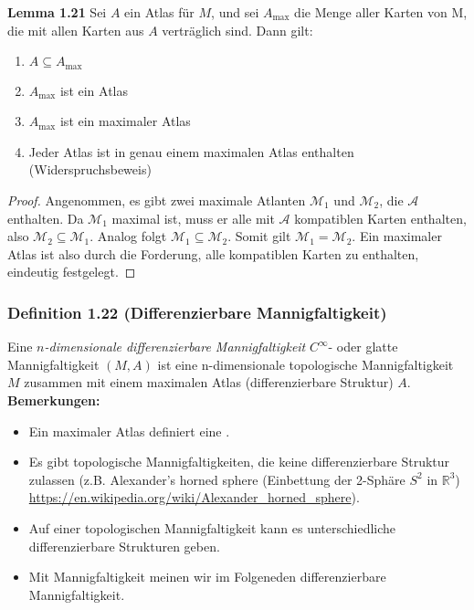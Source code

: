 \documentclass[fleqn, 12pt, letterpaper]{article}
\begin{document}
\textbf{Lemma 1.21}
Sei $A$ ein Atlas für $M$, und sei $A_{\max}$ die Menge aller Karten von M, die mit allen Karten aus $A$ verträglich sind. Dann gilt:
\begin{enumerate}
    \item $A \subseteq A_{\max}$
    \item $A_{\max}$ ist ein Atlas
    \item $A_{\max}$ ist ein maximaler Atlas
    \item Jeder Atlas ist in genau einem maximalen Atlas enthalten (Widerspruchsbeweis)
\end{enumerate}
\begin{proof}
  Angenommen, es gibt zwei maximale Atlanten $\mathcal{M}_1$ und $\mathcal{M}_2$, die $\mathcal{A}$ enthalten. Da $\mathcal{M}_1$ maximal ist, muss er alle mit $\mathcal{A}$ kompatiblen Karten enthalten, also $\mathcal{M}_2 \subseteq \mathcal{M}_1$. Analog folgt $\mathcal{M}_1 \subseteq \mathcal{M}_2$. Somit gilt $\mathcal{M}_1 = \mathcal{M}_2$. Ein maximaler Atlas ist also durch die Forderung, \glqq{}alle kompatiblen Karten zu enthalten\grqq{}, eindeutig festgelegt.
\end{proof}

\subsubsection*{Definition 1.22 (Differenzierbare Mannigfaltigkeit)}
Eine \emph{$n$-dimensionale differenzierbare Mannigfaltigkeit} $C^\infty$- oder glatte Mannigfaltigkeit $(M,A)$ ist eine n-dimensionale topologische Mannigfaltigkeit $M$ zusammen mit einem maximalen Atlas (differenzierbare Struktur) $A$.\\

\textbf{Bemerkungen:}
\begin{itemize}
    \item Ein maximaler Atlas definiert eine .
    \item Es gibt topologische Mannigfaltigkeiten, die keine differenzierbare Struktur zulassen (z.B. Alexander’s horned sphere (Einbettung der 2-Sphäre $S^2$ in $\mathbb{R}^3$) \url{https://en.wikipedia.org/wiki/Alexander_horned_sphere}).
    \item Auf einer topologischen Mannigfaltigkeit kann es unterschiedliche differenzierbare Strukturen geben.
    \item Mit Mannigfaltigkeit meinen wir im Folgeneden differenzierbare Mannigfaltigkeit.
\end{itemize}
\end{document}

